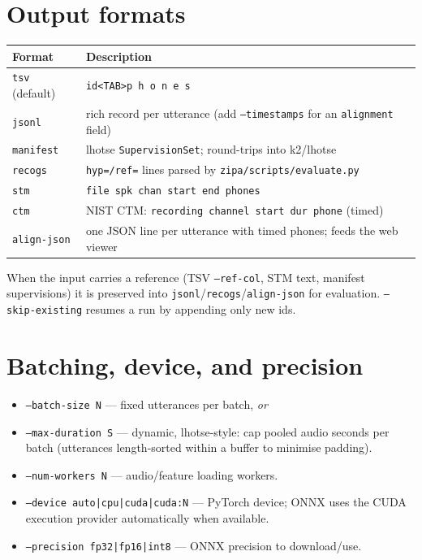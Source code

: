 \documentclass[11pt,a4paper]{article}
\newcommand{\code}[1]{\texttt{#1}}
\begin{document}
\section{Output formats}
\begin{longtable}{@{}ll@{}}
\toprule
\textbf{Format} & \textbf{Description} \\
\midrule
\endhead
\code{tsv} (default) & \code{id<TAB>p h o n e s} \\
\code{jsonl} & rich record per utterance (add \code{--timestamps} for an \code{alignment} field) \\
\code{manifest} & lhotse \code{SupervisionSet}; round-trips into k2/lhotse \\
\code{recogs} & \code{hyp=/ref=} lines parsed by \code{zipa/scripts/evaluate.py} \\
\code{stm} & \code{file spk chan start end phones} \\
\code{ctm} & NIST CTM: \code{recording channel start dur phone} (timed) \\
\code{align-json} & one JSON line per utterance with timed phones; feeds the web viewer \\
\bottomrule
\end{longtable}

When the input carries a reference (TSV \code{--ref-col}, STM text, manifest
supervisions) it is preserved into \code{jsonl}/\code{recogs}/\code{align-json} for
evaluation. \code{--skip-existing} resumes a run by appending only new ids.

\section{Batching, device, and precision}
\begin{itemize}[nosep]
  \item \code{--batch-size N} --- fixed utterances per batch, \emph{or}
  \item \code{--max-duration S} --- dynamic, lhotse-style: cap pooled audio seconds
        per batch (utterances length-sorted within a buffer to minimise padding).
  \item \code{--num-workers N} --- audio/feature loading workers.
  \item \code{--device auto|cpu|cuda|cuda:N} --- PyTorch device; ONNX uses the CUDA
        execution provider automatically when available.
  \item \code{--precision fp32|fp16|int8} --- ONNX precision to download/use.
\end{itemize}
\end{document}
